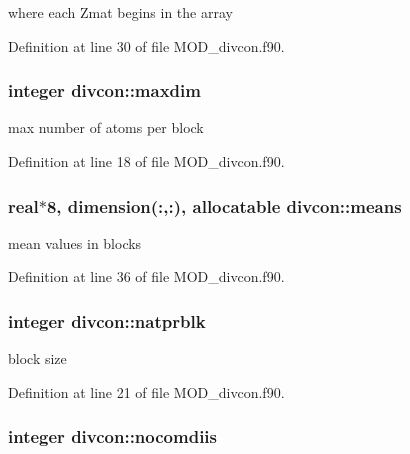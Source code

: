 where each Zmat begins in the array 



Definition at line 30 of file M\-O\-D\-\_\-divcon.\-f90.

\hypertarget{classdivcon_ad02ff9537429bbaeb6361a9d36339c86}{
\subsubsection[{maxdim}]{\setlength{\rightskip}{0pt plus 5cm}integer divcon\-::maxdim}}\label{classdivcon_ad02ff9537429bbaeb6361a9d36339c86}


max number of atoms per block 



Definition at line 18 of file M\-O\-D\-\_\-divcon.\-f90.

\hypertarget{classdivcon_a496460c2cb95e37ebd638af57e4cc0b2}{
\subsubsection[{means}]{\setlength{\rightskip}{0pt plus 5cm}real$\ast$8, dimension(\-:,\-:), allocatable divcon\-::means}}\label{classdivcon_a496460c2cb95e37ebd638af57e4cc0b2}


mean values in blocks 



Definition at line 36 of file M\-O\-D\-\_\-divcon.\-f90.

\hypertarget{classdivcon_a56d6b8747f40bfa7bf92740878cf7b50}{
\subsubsection[{natprblk}]{\setlength{\rightskip}{0pt plus 5cm}integer divcon\-::natprblk}}\label{classdivcon_a56d6b8747f40bfa7bf92740878cf7b50}


block size 



Definition at line 21 of file M\-O\-D\-\_\-divcon.\-f90.

\hypertarget{classdivcon_adc6683167f9989d9804a65ec3cac7909}{
\subsubsection[{nocomdiis}]{\setlength{\rightskip}{0pt plus 5cm}integer divcon\-::nocomdiis}}\label{classdivcon_adc6683167f9989d9804a65ec3cac7909}


